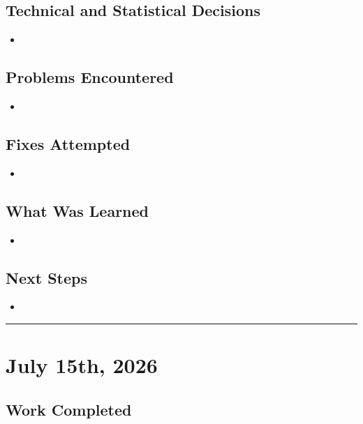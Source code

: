\documentclass[11pt,a4paper]{article}
\newcommand{\entryseparator}{
  \vspace{1em} \noindent\rule{\textwidth}{0.4pt}
  \vspace*{-\baselineskip} 
}
\begin{document}
\subsection{Technical and Statistical Decisions}

\begin{itemize}
    \item

\end{itemize}

\subsection{Problems Encountered}

\begin{itemize}
    \item 
\end{itemize}

\subsection{Fixes Attempted}

\begin{itemize}
    \item
\end{itemize}

\subsection{What Was Learned}

\begin{itemize}
    \item 
\end{itemize}

\subsection{Next Steps}

\begin{itemize}
    \item 
\end{itemize}
\entryseparator


\section{July 15th, 2026}

\subsection{Work Completed}
\end{document}

